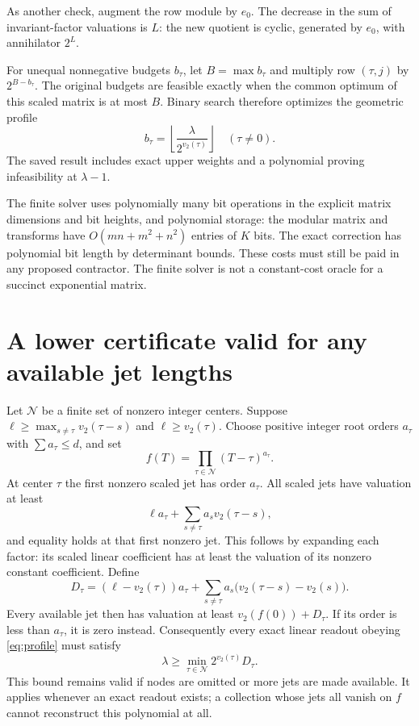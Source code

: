 \documentclass[11pt]{article}
\begin{document}
As another check, augment the row module by $e_0$. The decrease in the
sum of invariant-factor valuations is $L$: the new quotient is cyclic,
generated by $e_0$, with annihilator $2^L$.

For unequal nonnegative budgets $b_\tau$, let $B=\max b_\tau$ and
multiply row $(\tau,j)$ by $2^{B-b_\tau}$. The original budgets are
feasible exactly when the common optimum of this scaled matrix is
at most $B$. Binary search therefore optimizes the geometric profile
\begin{equation}
 b_\tau=\left\lfloor\frac{\lambda}{2^{v_2(\tau)}}\right\rfloor
 \quad(\tau\ne0).
 \label{eq:profile}
\end{equation}
The saved result includes exact upper weights and a polynomial proving
infeasibility at $\lambda-1$.

The finite solver uses polynomially many bit operations in the explicit
matrix dimensions and bit heights, and polynomial storage: the modular
matrix and transforms have $O(mn+m^2+n^2)$ entries of $K$ bits.
The exact correction has polynomial bit length by determinant bounds.
These costs must still be paid in any proposed contractor. The finite
solver is not a constant-cost oracle for a succinct exponential matrix.

\section{A lower certificate valid for any available jet lengths}
Let $\mathcal N$ be a finite set of nonzero integer centers. Suppose
$\ell\ge\max_{s\ne\tau}v_2(\tau-s)$ and $\ell\ge v_2(\tau)$.
Choose positive integer root orders $a_\tau$ with
$\sum a_\tau\le d$, and set
\[
 f(T)=\prod_{\tau\in\mathcal N}(T-\tau)^{a_\tau}.
\]
At center $\tau$ the first nonzero scaled jet has order $a_\tau$.
All scaled jets have valuation at least
\[
 \ell a_\tau+\sum_{s\ne\tau}a_s v_2(\tau-s),
\]
and equality holds at that first nonzero jet. This follows by expanding
each factor: its scaled linear coefficient has at least the valuation
of its nonzero constant coefficient. Define
\begin{equation}
 D_\tau=(\ell-v_2(\tau))a_\tau+
 \sum_{s\ne\tau}a_s\bigl(v_2(\tau-s)-v_2(s)\bigr).
 \label{eq:dual}
\end{equation}
Every available jet then has valuation at least $v_2(f(0))+D_\tau$.
If its order is less than $a_\tau$, it is zero instead.
Consequently every exact linear readout obeying \eqref{eq:profile}
must satisfy
\begin{equation}
 \lambda\ge\min_{\tau\in\mathcal N}2^{v_2(\tau)}D_\tau.
 \label{eq:lower}
\end{equation}
This bound remains valid if nodes are omitted or more jets are made
available. It applies whenever an exact readout exists; a collection
whose jets all vanish on $f$ cannot reconstruct this polynomial at all.
\end{document}
